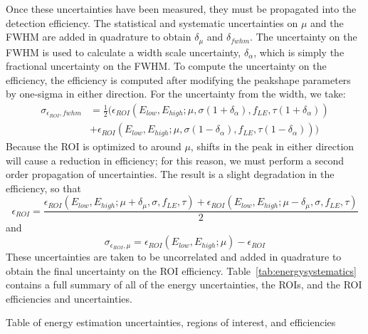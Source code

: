 \documentclass[notitlepage,rmp,aps,10pt]{revtex4-1}
\begin{document}
Once these uncertainties have been measured, they must be propagated into the detection efficiency.
The statistical and systematic uncertainties on $\mu$ and the FWHM are added in quadrature to obtain $\delta_\mu$ and $\delta_{fwhm}$.
The uncertainty on the FWHM is used to calculate a width scale uncertainty, $\delta_\alpha$, which is simply the fractional uncertainty on the FWHM.
To compute the uncertainty on the efficiency, the efficiency is computed after modifying the peakshape parameters by one-sigma in either direction.
For the uncertainty from the width, we take:
\begin{equation}
  \begin{aligned}
    \sigma_{\epsilon_{ROI},fwhm} &= \frac{1}{2}\big(\epsilon_{ROI}(E_{low}, E_{high}; \mu, \sigma(1+\delta_\alpha), f_{LE}, \tau(1+\delta_\alpha)) \\&+ \epsilon_{ROI}(E_{low}, E_{high}; \mu, \sigma(1-\delta_\alpha), f_{LE}, \tau(1-\delta_\alpha))\big)
  \end{aligned}
\end{equation}
Because the ROI is optimized to around $\mu$, shifts in the peak in either direction will cause a reduction in efficiency; for this reason, we must perform a second order propagation of uncertainties.
The result is a slight degradation in the efficiency, so that
\begin{equation}
  \epsilon_{ROI} =  \frac{\epsilon_{ROI}(E_{low}, E_{high}; \mu + \delta_\mu, \sigma, f_{LE}, \tau) + \epsilon_{ROI}(E_{low}, E_{high}; \mu - \delta_\mu, \sigma, f_{LE}, \tau)}{2}
\end{equation}
and
\begin{equation}
  \sigma_{\epsilon_{ROI},\mu} = \epsilon_{ROI}(E_{low}, E_{high}; \mu) - \epsilon_{ROI}
\end{equation}
These uncertainties are taken to be uncorrelated and added in quadrature to obtain the final uncertainty on the ROI efficiency.
Table~\ref{tab:energysystematics} contains a full summary of all of the energy uncertainties, the ROIs, and the ROI efficiencies and uncertainties.
\begin{table}
  \caption[Energy systematics]{ \label{tab:energysystematics}
    Table of energy estimation uncertainties, regions of interest, and efficiencies
  }
  \resizebox{\textwidth}{!}{%
   }
\end{table}
\end{document}

